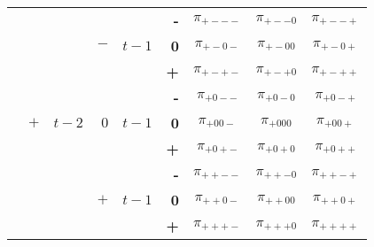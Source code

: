 \documentclass{article}[]
\begin{document}
\begin{center}
\begin{tabular}{r | r | r | r | r | r | c c c | }
&&&&& \textbf{-} & $\pi_{+---}$	& $\pi_{+--0}$	& $\pi_{+--+}$ \\ 
&&& $-$ &$t-1$ & \textbf{0} & $\pi_{+-0-}$	& $\pi_{+-00}$	& $\pi_{+-0+}$	\\
&&&&& \textbf{+} & $\pi_{+-+-}$	& $\pi_{+-+0}$	& $\pi_{+-++}$ \\ \cline{4-4} \cline{6-9}
&&&&& \textbf{-} & $\pi_{+0--}$	& $\pi_{+0-0}$	& $\pi_{+0-+}$ \\ 
& $+$  & $t-2$ & $0$   &$t-1$ & \textbf{0} & $\pi_{+00-}$	& $\pi_{+000}$	& $\pi_{+00+}$	\\
&&&&& \textbf{+} & $\pi_{+0+-}$ & $\pi_{+0+0}$	& $\pi_{+0++}$ \\ \cline{4-4} \cline{6-9}
&&&&& \textbf{-} & $\pi_{++--}$ & $\pi_{++-0}$	& $\pi_{++-+}$ \\ 
&&&$+$   &$t-1$ & \textbf{0} & $\pi_{++0-}$	& $\pi_{++00}$	& $\pi_{++0+}$	\\
&&&&& \textbf{+} & $\pi_{+++-}$	& $\pi_{+++0}$	& $\pi_{++++}$ \\ \cline{2-2} \cline{4-4} \cline{6-9}
\end{tabular}    
\end{center}
\end{document}
